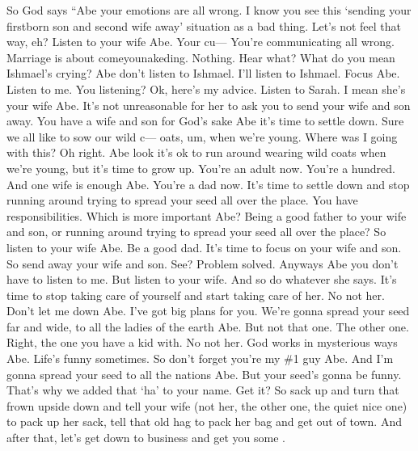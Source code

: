 {
}
{
}
{
	So God says ``Abe your emotions are all wrong. I know you see this `sending your firstborn son and second wife away' situation as a bad thing. Let's not feel that way, eh? Listen to your wife Abe. Your cu--- You're communicating all wrong. Marriage is about comeyounakeding. Nothing. Hear what? What do you mean Ishmael's crying? Abe don't listen to Ishmael. I'll listen to Ishmael. Focus Abe. Listen to me. You listening? Ok, here's my advice. Listen to Sarah. I mean she's your wife Abe. It's not unreasonable for her to ask you to send your wife and son away. You have a wife and son for God's sake Abe it's time to settle down. Sure we all like to sow our wild c--- oats, um, when we're young. Where was I going with this? Oh right. Abe look it's ok to run around wearing wild coats when we're young, but it's time to grow up. You're an adult now. You're a hundred. And one wife is enough Abe. You're a dad now. It's time to settle down and stop running around trying to spread your seed all over the place. You have responsibilities. Which is more important Abe? Being a good father to your wife and son, or running around trying to spread your seed all over the place? So listen to your wife Abe. Be a good dad. It's time to focus on your wife and son. So send away your wife and son. See? Problem solved. Anyways Abe you don't have to listen to me. But listen to your wife. And so do whatever she says. It's time to stop taking care of yourself and start taking care of her. No not her. Don't let me down Abe. I've got big plans for you. We're gonna spread your seed far and wide, to all the ladies of the earth Abe. But not that one. The other one. Right, the one you have a kid with. No not her. God works in mysterious ways Abe. Life's funny sometimes. So don't forget you're my \#1 guy Abe. And I'm gonna spread your seed to all the nations Abe. But your seed's gonna be funny. That's why we added that `ha' to your name. Get it? So sack up and turn that frown upside down and tell your wife (not her, the other one, the quiet nice one) to pack up her sack, tell that old hag to pack her bag and get out of town. And after that, let's get down to business and get you some {\pussya}.

}

